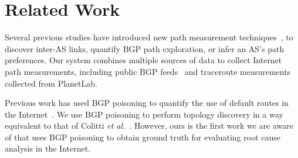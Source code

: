 \section{Related Work}
\label{sec:related}

  Several previous studies have
introduced new path measurement techniques~\cite{as-relationships,
shaikh:nsdi04, hubble, iplane, planetseer, oliveira09exploration,
revtr}, \eg to discover inter-AS links, quantify BGP path exploration,
or infer an AS's path preferences.  Our system combines multiple sources
of data to collect Internet path measurements, including public
BGP feeds~\cite{routeviews} and traceroute measurements collected from
PlanetLab.  
\begin{comment}
Less widespread is our use of Reverse
Traceroute~\cite{revtr} to collect path measurements from arbitrary ASes
back to monitored prefixes.  Reverse Traceroute sends IP Record Route
probes to a target router from distributed vantage points spoofing as
the source, so that the source receives a sequence of routers on the
path back from the target router to itself.  Even though Reverse
Traceroute does not work on paths that filter IP Record Route probes or
spoofed packets, it helps us cover ASes invisible from BGP feeds or
traceroutes. 
\end{comment}
Previous work has used BGP poisoning to quantify the use
of default routes in the Internet~\cite{optometry}.  We use BGP
poisoning to perform topology discovery in a way equivalent to that of
Colitti \emph{et al.}~\cite{lorenzo-thesis}.  However, ours is the first
work we are aware of that uses BGP poisoning to obtain ground truth for
evaluating root cause analysis in the Internet.  



